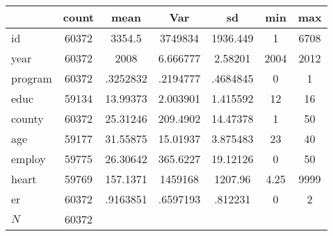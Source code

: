 {
\def\sym#1{\ifmmode^{#1}\else\(^{#1}\)\fi}
\begin{tabular}{l*{1}{cccccc}}
\hline\hline
            &       count&        mean&         Var&          sd&         min&         max\\
\hline
id          &       60372&      3354.5&     3749834&    1936.449&           1&        6708\\
year        &       60372&        2008&    6.666777&     2.58201&        2004&        2012\\
program     &       60372&    .3252832&    .2194777&    .4684845&           0&           1\\
educ        &       59134&    13.99373&    2.003901&    1.415592&          12&          16\\
county      &       60372&    25.31246&    209.4902&    14.47378&           1&          50\\
age         &       59177&    31.55875&    15.01937&    3.875483&          23&          40\\
employ      &       59775&    26.30642&    365.6227&    19.12126&           0&          50\\
heart       &       59769&    157.1371&     1459168&     1207.96&        4.25&        9999\\
er          &       60372&    .9163851&    .6597193&     .812231&           0&           2\\
\hline
\(N\)       &       60372&            &            &            &            &            \\
\hline\hline
\end{tabular}
}
